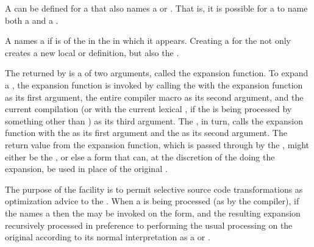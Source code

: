 
A  can be defined for a 
that also names a  or .
That is, it is possible for a
 to name both a  and a .

A  names a  if 
is  of the  in the  in which
it appears.  Creating a  for the 
not only creates a new local  or
 definition, but also  the .

The  returned by 
is a  of two arguments, called the
expansion function.  To expand a ,
the expansion function is invoked by calling the  with
      the expansion function as its first argument,
      the entire compiler macro  as its second argument,
  and the current compilation  
       (or with the current lexical ,
 	 if the  is being processed by something
	 other than ) 
       as its third argument.
The , in turn, calls the expansion function with the
 as its first argument and the  as its second argument.
The return value from the expansion function, which is passed through
by the , might either be the  , 
or else a form that can, at the discretion of the  doing the expansion, 
be used in place of the original .



The purpose of the  facility is to permit 
selective source code transformations as optimization advice 
to the .  When a  is being
processed (as by the compiler), if the  names a
 then the  may be
invoked on the form, and the resulting expansion recursively processed
in preference to performing the usual processing on the original 
according to its normal interpretation as a  or
.
 
